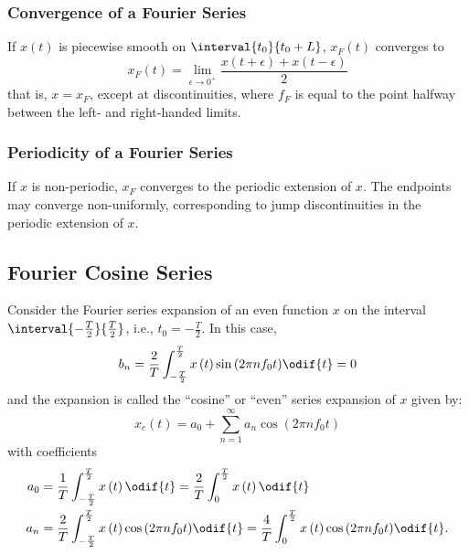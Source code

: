 \documentclass{article}
\begin{document}
\subsubsection{Convergence of a Fourier Series}
If \(x\left( t \right)\) is piecewise smooth on \(\interval{t_0}{t_0 +
L}\), \(x_F\left( t \right)\) converges to
\begin{equation*}
    x_F\left( t \right) = \lim_{\epsilon \to 0^{+}} \frac{x\left( t + \epsilon \right) + x\left( t - \epsilon \right)}{2}
\end{equation*}
that is, \(x = x_F\), except at discontinuities, where \(f_F\) is equal
to the point halfway between the left- and right-handed limits.
\subsubsection{Periodicity of a Fourier Series}
If \(x\) is non-periodic, \(x_F\) converges to the periodic extension
of \(x\). The endpoints may converge non-uniformly, corresponding to
jump discontinuities in the periodic extension of \(x\).
\subsection{Fourier Cosine Series}
Consider the Fourier series expansion of an even function \(x\) on the
interval \(\interval{-\frac{T}{2}}{\frac{T}{2}}\), i.e., \(t_0 =
-\frac{T}{2}\). In this case,
\begin{equation*}
    b_n = \frac{2}{T} \int_{-\frac{T}{2}}^{\frac{T}{2}} x\left( t \right) \sin{\left( 2\pi n f_0 t \right)} \odif{t} = 0
\end{equation*}
and the expansion is called the ``cosine'' or ``even'' series expansion
of \(x\) given by:
\begin{equation*}
    x_c\left( t \right) = a_0 + \sum_{n = 1}^\infty a_n \cos{\left( 2\pi n f_0 t \right)}
\end{equation*}
with coefficients
\begin{align*}
    a_0 & = \frac{1}{T} \int_{-\frac{T}{2}}^{\frac{T}{2}} x\left( t \right) \odif{t}                                    = \frac{2}{T} \int_0^{\frac{T}{2}} x\left( t \right) \odif{t}                                    \\
    a_n & = \frac{2}{T} \int_{-\frac{T}{2}}^{\frac{T}{2}} x\left( t \right) \cos{\left( 2 \pi n f_0 t \right)} \odif{t} = \frac{4}{T} \int_0^{\frac{T}{2}} x\left( t \right) \cos{\left( 2\pi n f_0 t \right)} \odif{t}.
\end{align*}
\end{document}
